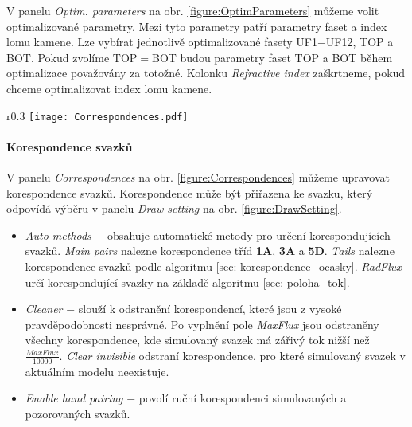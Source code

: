 V panelu \textit{Optim. parameters} na obr. \ref{figure:OptimParameters} můžeme volit optimalizované parametry. Mezi tyto parametry patří parametry faset a index lomu kamene. Lze vybírat jednotlivě optimalizované fasety UF1$-$UF12, TOP a BOT. Pokud zvolíme TOP$=$BOT budou parametry faset TOP a BOT během optimalizace považovány za totožné. Kolonku \textit{Refractive index} zaškrtneme, pokud chceme optimalizovat index lomu kamene. 

\newpage



\begin{wrapfigure}[16]{r}{0.3\textwidth}
\centering
\texttt{[image: Correspondences.pdf]}
	
\caption{Panel pro kontrolu korespondencí svazků.}
\label{figure:Correspondences}
\end{wrapfigure}

\paragraph{Korespondence svazků}
\hspace{1mm}
\vspace{2mm}

V panelu \textit{Correspondences} na obr. \ref{figure:Correspondences} můžeme upravovat korespondence svazků. Korespondence může být přiřazena ke svazku, který odpovídá výběru v panelu \textit{Draw setting} na obr. \ref{figure:DrawSetting}.

\begin{itemize}
	\item \textit{Auto methods} $-$ obsahuje automatické metody pro určení korespondujících svazků. \textit{Main pairs} nalezne korespondence tříd \textbf{1A}, \textbf{3A} a \textbf{5D}. \textit{Tails} nalezne korespondence svazků podle algoritmu \ref{sec: korespondence_ocasky}. \textit{RadFlux} určí korespondující svazky na základě algoritmu \ref{sec: poloha_tok}.  
	
	\item \textit{Cleaner} $-$ slouží k odstranění korespondencí, které jsou z vysoké pravděpodobnosti nesprávné. Po vyplnění pole \textit{MaxFlux} jsou odstraněny všechny korespondence, kde simulovaný svazek má zářivý tok nižší než $\frac{\mathit{MaxFlux}}{10000}$. \textit{Clear invisible} odstraní korespondence, pro které simulovaný svazek v aktuálním modelu neexistuje. 
	
	\item \textit{Enable hand pairing} $-$ povolí ruční korespondenci simulovaných a pozorovaných svazků.
\end{itemize}


